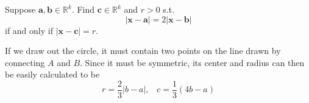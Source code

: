   \begin{exercise}[Rudin 1.19]
    Suppose $\mathbf{a}, \mathbf{b} \in \mathbb{R}^k$. Find $\mathbf{c} \in \mathbb{R}^k$ and $r > 0$ s.t. 
    \begin{equation}
      |\mathbf{x} - \mathbf{a}| = 2 | \mathbf{x} - \mathbf{b}|
    \end{equation}
    if and only if $|\mathbf{x} - \mathbf{c}| = r$. 
  \end{exercise}
  \begin{solution}
    If we draw out the circle, it must contain two points on the line drawn by connecting $A$ and $B$. Since it must be symmetric, its center and radius can then be easily calculated to be 
    \begin{equation}
      r = \frac{2}{3} |b - a|, \;\;\; c = \frac{1}{3} (4b - a)
    \end{equation}
  \end{solution}

